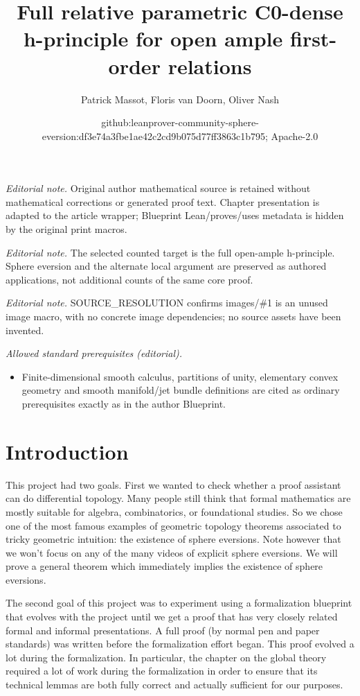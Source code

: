 \documentclass[10pt,a4paper]{article}
\title{Full relative parametric C0-dense h-principle for open ample first-order relations}
\author{Patrick Massot, Floris van Doorn, Oliver Nash}
\date{github:leanprover-community-sphere-eversion:df3e74a3fbe1ae42c2cd9b075d77ff3863c1b795; Apache-2.0}
\newcounter{chapter}
\begin{document}
\maketitle
\noindent\textit{Editorial note.} Original author mathematical source is retained without mathematical corrections or generated proof text. Chapter presentation is adapted to the article wrapper; Blueprint Lean/proves/uses metadata is hidden by the original print macros.\par\medskip
\noindent\textit{Editorial note.} The selected counted target is the full open-ample h-principle. Sphere eversion and the alternate local argument are preserved as authored applications, not additional counts of the same core proof.\par\medskip
\noindent\textit{Editorial note.} SOURCE\_RESOLUTION confirms images/\#1 is an unused image macro, with no concrete image dependencies; no source assets have been invented.\par\medskip
\noindent\textit{Allowed standard prerequisites (editorial).}\begin{itemize}
\item Finite-dimensional smooth calculus, partitions of unity, elementary convex geometry and smooth manifold/jet bundle definitions are cited as ordinary prerequisites exactly as in the author Blueprint.
\end{itemize}\medskip
\chapter*{Introduction}
\label{cha:intro}

This project had two goals. First we wanted to check whether a proof
assistant can do differential topology. Many people still think that
formal mathematics are mostly suitable for algebra, combinatorics, or
foundational studies. So we chose one of the most famous examples
of geometric topology theorems associated to tricky geometric intuition:
the existence of sphere eversions. Note however that we won't focus on
any of the many videos of explicit sphere eversions. We will prove a
general theorem which immediately implies the existence of sphere
eversions.

The second goal of this project was to experiment using a formalization
blueprint that evolves with the project until we get a proof that has
very closely related formal and informal presentations. A full proof (by
normal pen and paper standards) was written before the formalization
effort began. This proof evolved a lot during the formalization. In
particular, the chapter on the global theory required a lot of work
during the formalization in order to ensure that its technical lemmas
are both fully correct and actually sufficient for our purposes.
\end{document}
